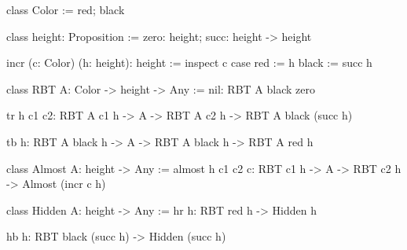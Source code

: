 \begin{alba}
    class Color := red; black

    class height: Proposition := zero: height; succ: height -> height


    incr (c: Color) (h: height): height :=
        inspect c case
            red := h
            black := succ h

    class
        RBT A: Color -> height -> Any
    :=
        nil: RBT A black zero

        tr h c1 c2: RBT A c1 h -> A -> RBT A c2 h -> RBT A black (succ h)

        tb h: RBT A black h -> A -> RBT A black h -> RBT A red h


    class
        Almost A: height -> Any
    :=
        almost h c1 c2 c: RBT c1 h -> A -> RBT c2 h -> Almost (incr c h)

    class
        Hidden A: height -> Any
    :=
        hr h: RBT red h -> Hidden h

        hb h: RBT black (succ h) -> Hidden (succ h)
\end{alba}











